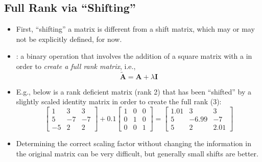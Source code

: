 \begin{itemize}
  \subsection{Full Rank via ``Shifting''}\label{Full Rank via ``Shifting''}
  \begin{itemize}
    \item First, ``shifting'' a matrix is different from a shift matrix, which may or may not be explicitly defined, for now. 
    \item {} : a binary operation that involves the addition of a square matrix with a \hyperref[Diagonal and Triagnular Matrices]{} in order to \emph{create a full rank matrix}, i.e.,
    \[%
    \tilde{\bm{A}}=\bm{A}+\lambda \bm{I}
    \]%
    \item E.g., below is a rank deficient matrix (rank 2) that has been ``shifted'' by a slightly scaled identity matrix in order to create the full rank (3):
    \[%
    \begin{bmatrix}
      1 & 3 & 3 \\
      5 & -7 & -7  \\
      -5 & 2  & 2 
    \end{bmatrix} +
    0.1 
    \begin{bmatrix}
      1 & 0 & 0 \\
      0 & 1 & 0 \\
      0 & 0 & 1 
    \end{bmatrix} =
    \begin{bmatrix}
      1.01 & 3 & 3 \\
      5 & -6.99 & -7  \\
      5 & 2  & 2.01 
    \end{bmatrix}
    \]%
    \item Determining the correct scaling factor without changing the information in the original matrix can be very difficult, but generally small shifts are better. 
  \end{itemize}
\end{itemize}
  


